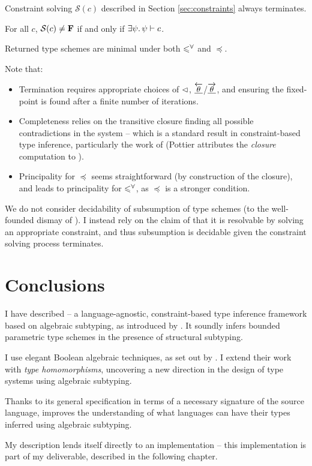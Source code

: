 \begin{conjecture}[Termination]
    Constraint solving $\mathcal S(c)$ described in Section \ref{sec:constraints} always terminates.
\end{conjecture}

\begin{conjecture}[Completeness]    
    For all $c$, $\mathcal S(c) \ne \mathbf F$ if and only if $\exists \psi \ldotp \psi \vdash c$.
\end{conjecture}

\begin{conjecture}[Principality]
    Returned type schemes are minimal under both $\leqslant^\forall$ and $\preceq$.
\end{conjecture}

Note that: \begin{itemize}
    \item Termination requires appropriate choices of $\lhd$, $\underline{\overleftarrow{\theta}}$/$\underline{\overrightarrow{\theta}}$, and ensuring the fixed-point is found after a finite number of iterations.
    \item Completeness relies on the transitive closure finding all possible contradictions in the system -- which is a standard result in constraint-based type inference, particularly the work of \textcite{pottier-framework} (Pottier attributes the \emph{closure} computation to \textcite{closure-in-type-inference}).
    \item Principality for $\preceq$ seems straightforward (by construction of the closure), and leads to principality for $\leqslant^\forall$, as $\preceq$ is a stronger condition.
\end{itemize}
We do not consider decidability of subsumption of type schemes (to the well-founded dismay of \textcite{dolan-thesis}). I instead rely on the claim of \textcite{mlstruct} that it is resolvable by solving an appropriate constraint, and thus subsumption is decidable given the constraint solving process terminates.

\section{Conclusions}
\label{sec:conclusions}

I have described \inference{} -- a language-agnostic, constraint-based type inference framework based on algebraic subtyping, as introduced by \textcite{mlsub}.
It soundly infers bounded parametric type schemes in the presence of structural subtyping. 

I use elegant Boolean algebraic techniques, as set out by \textcite{mlstruct}. I extend their work with \emph{type homomorphisms}, uncovering a new direction in the design of type systems using algebraic subtyping. 

Thanks to its general specification in terms of a necessary signature of the source language, \inference{} improves the understanding of what languages can have their types inferred using algebraic subtyping.

My description lends itself directly to an implementation -- this implementation is part of my deliverable, described in the following chapter.
